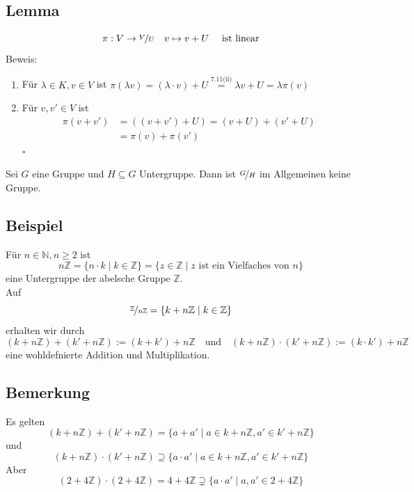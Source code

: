 \subsection{Lemma} %
\label{sub:lemma}
\[
	\pi : V \to \nicefrac{V}{U} \quad v \mapsto v+ U \quad \text{ ist linear}
\] 
Beweis:
\begin{enumerate}[1)]
	\item Für $\lambda \in K, v \in V$ ist $\pi(\lambda v)= (\lambda \cdot v)+U \overset{\text{7.11(ii)}}{=} \lambda {v+U} = \lambda \pi (v)$
	\item Für $v,v' \in V$ ist 
	\begin{align*}
		\pi (v+v') &= ((v+v')+U) = (v+U)+(v'+U) \\
		&= \pi(v)+ \pi(v')  
	\end{align*} \hfill $\square$
\end{enumerate}
{\large \boxed{!}} Sei $G$ eine Gruppe und $H \subseteq G$ Untergruppe. Dann ist $\nicefrac{G}{H}$ im Allgemeinen keine Gruppe.

\subsection{Beispiel} %
\label{sub:beispiel}
Für $n \in \mathds{N} , n \ge 2$ ist 
\[
	n \mathds{Z} = \{ n \cdot k \mid k \in \mathds{Z} \} = \{z \in \mathds{Z} \mid z \text{ ist ein Vielfaches von } n\}
\] 
eine Untergruppe der abelsche Gruppe $\mathds{Z}$. \\
Auf 
\[
	\nicefrac{\mathds{Z}}{n \mathds{Z}} = \{ k+n \mathds{Z} \mid k \in \mathds{Z}\}
\]
erhalten wir durch 
\[
	(k+n \mathds{Z})+(k' + n \mathds{Z}) := (k+k')+ n \mathds{Z} \quad \text{und} \quad (k+n \mathds{Z})\cdot (k'+ n \mathds{Z}) := (k \cdot k')+ n \mathds{Z}
\]
eine wohldefnierte Addition und Multiplikation.

\subsection{Bemerkung} %
\label{sub:bemerkung}
Es gelten
\[
	(k+ n \mathds{Z})+(k' + n \mathds{Z}) = \{ a+a' \mid a \in k+n \mathds{Z} , a' \in k'+ n \mathds{Z} \}
\]
und
\[
	(k+n \mathds{Z})\cdot (k'+n \mathds{Z}) \supseteq \{ a \cdot  a' \mid a \in k+n \mathds{Z} , a' \in k' + n \mathds{Z} \}
\]
Aber 
\[
	(2+4 \mathds{Z})\cdot ( 2+4 \mathds{Z}) = 4+4 \mathds{Z} \supsetneq \{ a \cdot  a' \mid a,a' \in 2+4 \mathds{Z} \}
\]

